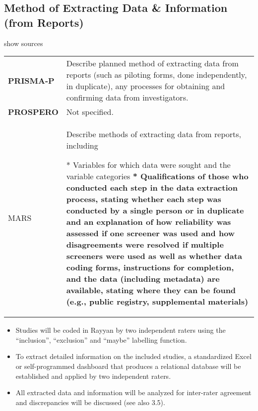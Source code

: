 \documentclass[
]{article}
\begin{document}
\hypertarget{method-of-extracting-data-information-from-reports}{%
\subsection{Method of Extracting Data \& Information (from
Reports)}\label{method-of-extracting-data-information-from-reports}}

show sources

\hypertarget{edfr}{}
\begin{collapse}

\begin{table}[H]
\centering
\begin{tabular}{>{}l|l}
\hline
\cellcolor[HTML]{ececec}{source} & \cellcolor[HTML]{ececec}{description}\\
\hline
\textbf{PRISMA-P} & Describe planned method of extracting data from reports (such as piloting forms, done independently, in duplicate), any processes for obtaining and confirming data from investigators.\\
\hline
\textbf{PROSPERO} & Not specified.\\
\hline
MARS & Describe methods of extracting data from reports, including 

* Variables for which data were sought and the variable categories 
\textbf{* Qualifications of those who conducted each step in the data extraction process, stating whether each step was conducted by a single person or in duplicate and an explanation of how reliability was assessed if one screener was used and how disagreements were resolved if multiple screeners were used as well as whether data coding forms, instructions for completion, and the data (including metadata) are available, stating where they can be found (e.g., public registry, supplemental materials)}\\
\hline
\end{tabular}
\end{table}

\end{collapse}

\begin{itemize}
\item
  Studies will be coded in Rayyan by two independent raters using the
  ``inclusion'', ``exclusion'' and ``maybe'' labelling function.
\item
  To extract detailed information on the included studies, a
  standardized Excel or self-programmed dashboard that produces a
  relational database will be established and applied by two independent
  raters.
\item
  All extracted data and information will be analyzed for inter-rater
  agreement and discrepancies will be discussed (see also 3.5).
\end{itemize}
\end{document}
